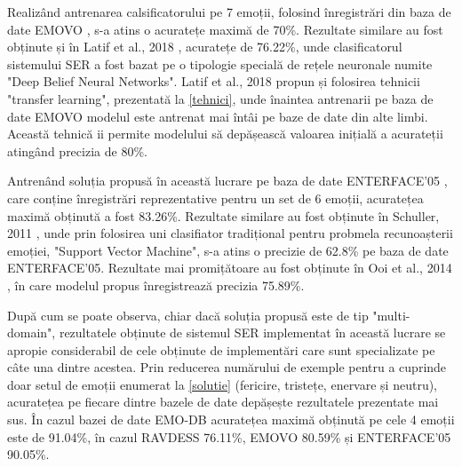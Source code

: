 \documentclass[a4paper,12pt]{book}
\begin{document}
		 Realizând antrenarea calsificatorului pe 7 emoții, folosind înregistrări din baza de date EMOVO \cite{emovo}, s-a atins o acuratețe maximă de 70\%. Rezultate similare au fost obținute și în Latif et al., 2018 \cite{comp5}, acuratețe de 76.22\%, unde clasificatorul sistemului SER a fost bazat pe o tipologie specială de rețele neuronale numite "Deep Belief Neural Networks". Latif et al., 2018 \cite{comp5} propun și folosirea tehnicii "transfer learning", prezentată la \ref{tehnici}, unde înaintea antrenarii pe baza de date EMOVO modelul este antrenat mai întâi pe baze de date din alte limbi. Această tehnică ii permite modelului să depășească valoarea inițială a acurateții atingând precizia de 80\%. \par 
		 Antrenând soluția propusă în această lucrare pe baza de date ENTERFACE'05 \cite{enterface}, care conține înregistrări reprezentative pentru un set de 6 emoții, acuratețea maximă obținută a fost 83.26\%. Rezultate similare au fost obținute în Schuller, 2011 \cite{comp6}, unde prin folosirea uni clasifiator tradițional pentru probmela recunoașterii emoției, "Support Vector Machine", s-a atins o precizie de 62.8\% pe baza de date ENTERFACE'05. Rezultate mai promițătoare au fost obținute în Ooi et al., 2014 \cite{comp7}, în care modelul propus înregistrează precizia 75.89\%. \par
		 După cum se poate observa, chiar dacă soluția propusă este de tip "multi-domain", rezultatele obținute de sistemul SER implementat în această lucrare se apropie considerabil de cele obținute de implementări care sunt specializate pe câte una dintre acestea. Prin reducerea numărului de exemple pentru a cuprinde doar setul de emoții enumerat la \ref{solutie} (fericire, tristețe, enervare și neutru), acuratețea pe fiecare dintre bazele de date depășește rezultatele prezentate mai sus. În cazul bazei de date EMO-DB acuratețea maximă obținută pe cele 4 emoții este de 91.04\%, în cazul RAVDESS 76.11\%, EMOVO 80.59\% și ENTERFACE'05 90.05\%.  
		 
\end{document}
